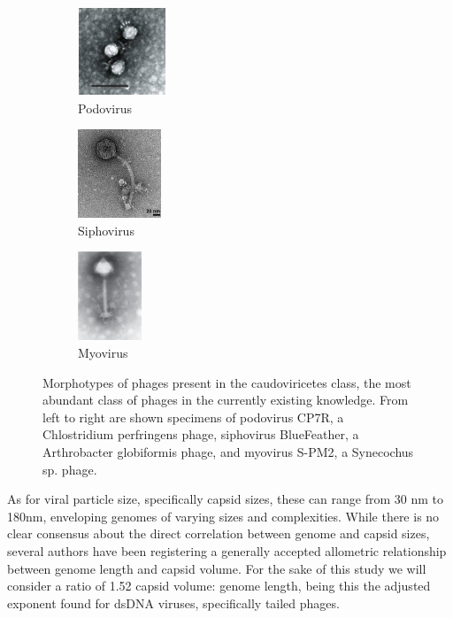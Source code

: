 \documentclass[runningheads]{llncs}
\begin{document}
\begin{figure}
    
    \begin{subfigure}[b]{0.3\textwidth}
        \begin{center}
        \includegraphics[height = 100px]{./figures/fig-3-1-podovirus.jpg}
        \caption{Podovirus}
        \end{center}
    \end{subfigure}
    \hfill
    \begin{subfigure}[b]{0.3\textwidth}
    \begin{center}
        
    
        \includegraphics[height = 100px]{./figures/fig-3-2-siphovirus.jpeg}
        \caption{Siphovirus}
        \end{center}
    \end{subfigure}
    \hfill
    \begin{subfigure}[b]{0.3\textwidth}
    \begin{center}
        \includegraphics[height = 100px]{./figures/fig-3-3-myovirus.png}
        \caption{Myovirus}
        \end{center}
    \end{subfigure}
    \caption{Morphotypes of phages present in the caudoviricetes class, the most abundant class of phages in the currently existing knowledge. From left to right are shown specimens of podovirus CP7R, a Chlostridium perfringens phage, siphovirus BlueFeather, a Arthrobacter globiformis phage, and myovirus S-PM2, a Synecochus sp. phage. \cite{volozhantsev2012,demo2021,mann2005}}
    \label{fig3}
\end{figure}
As for viral particle size, specifically capsid sizes, these can range from 30 nm to 180nm, enveloping genomes of varying sizes and complexities. \cite{luque2020,lee2022} While there is no clear consensus about the direct correlation between genome and capsid sizes, several authors have been registering a generally accepted allometric relationship between genome length and capsid volume. For the sake of this study we will consider a ratio of 1.52 capsid volume: genome length, being this the adjusted exponent found for dsDNA viruses, specifically tailed phages. \cite{luque2020,lee2022,cui2014,chaudhari2021} 
\end{document}
